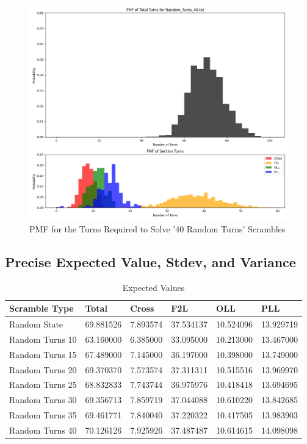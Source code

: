 \documentclass[12pt,letterpaper]{article}
\numberwithin{equation}{section}
\begin{document}
	\begin{figure}[H]
		\centering
		 \includegraphics[width=6in]{pmf_turns_40.png}
		 \caption{PMF for the Turns Required to Solve '40 Random Turns' Scrambles}
		 \label{fig:pmf_turns_40_plot}
	\end{figure}
	\newpage


\subsection{Precise Expected Value, Stdev, and Variance}


\begin{table}[H]
\centering
\caption{Expected Values}
\begin{tabular}{|p{4cm}|p{2cm}|p{2cm}|p{2cm}|p{2cm}|p{2cm}|}
\hline
\textbf{Scramble Type} & \textbf{Total} & \textbf{Cross} & \textbf{F2L} & \textbf{OLL} & \textbf{PLL} \\ \hline
Random State & 69.881526 & 7.893574 & 37.534137 & 10.524096 & 13.929719 \\ \hdashline
Random Turns 10 & 63.160000 & 6.385000 & 33.095000 & 10.213000 & 13.467000 \\ 
Random Turns 15 & 67.489000 & 7.145000 & 36.197000 & 10.398000 & 13.749000 \\ 
Random Turns 20 & 69.370370 & 7.573574 & 37.311311 & 10.515516 & 13.969970 \\
Random Turns 25 & 68.832833 & 7.743744 & 36.975976 & 10.418418 & 13.694695 \\ 
Random Turns 30 & 69.356713 & 7.859719 & 37.044088 & 10.610220 & 13.842685 \\ 
Random Turns 35 & 69.461771 & 7.840040 & 37.220322 & 10.417505 & 13.983903 \\ 
Random Turns 40 & 70.126126 & 7.925926 & 37.487487 & 10.614615 & 14.098098 \\ \hline
\end{tabular}
\end{table}
\end{document}
